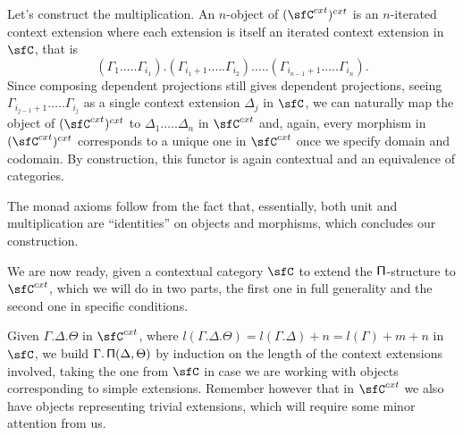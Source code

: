 \begin{construction}
  Let's construct the multiplication. An $n$-object of $(\sfC^{cxt})^{cxt}$ is an
  $n$-iterated context extension where each extension is itself an iterated
  context extension in $\sfC$, that is
  \[(\Gamma_1.\ldots.\Gamma_{i_1}).(\Gamma_{i_1+1}.\ldots.\Gamma_{i_2}).\ldots.(\Gamma_{i_{n-1}+1}.\ldots.\Gamma_{i_n}).\]
  Since composing dependent projections still gives dependent projections,
  seeing $\Gamma_{i_{j-1}+1}.\ldots.\Gamma_{i_j}$ as a single context extension
  $\Delta_j$ in $\sfC$, we can naturally
  map the object of $(\sfC^{cxt})^{cxt}$ to $\Delta_1.\ldots.\Delta_n$ in
  $\sfC^{cxt}$ and, again, every morphism
  in $(\sfC^{cxt})^{cxt}$ corresponds to a unique one in $\sfC^{cxt}$ once we
  specify domain and codomain. By construction, this functor is again contextual
  and an equivalence of categories.

  The monad axioms follow from the fact that, essentially, both unit and
  multiplication are ``identities'' on objects and morphisms, which concludes
  our construction.
\end{construction}

We are now ready, given a contextual category $\sfC$ to extend the
$\operatorname{\mathsf{\Pi}}$-structure to $\sfC^{cxt}$, which we will do in two parts,
the first one in full generality and the second one in specific conditions.

Given $\Gamma.\Delta.\Theta$ in $\sfC^{cxt}$, where
$l(\Gamma.\Delta.\Theta)=l(\Gamma.\Delta)+n=l(\Gamma)+m+n$ in $\sfC$, we
build $\Gamma.\operatorname{\mathsf{\Pi}}(\Delta,\Theta)$ by induction on the length of the context
extensions involved, taking the
one from $\sfC$ in case we are working with objects corresponding to simple
extensions. Remember however that in $\sfC^{cxt}$ we also have objects
representing trivial extensions, which will require some minor attention from
us.

